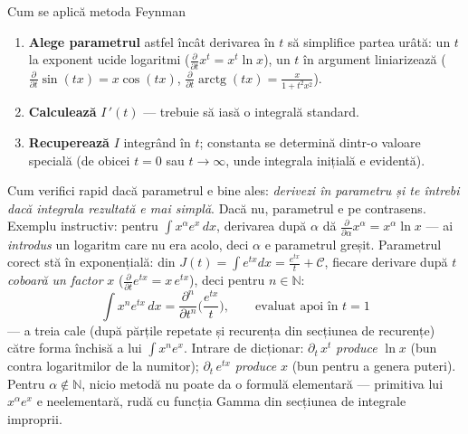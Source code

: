 \begin{tehbox}{Cum se aplică metoda Feynman}
\begin{enumerate}[leftmargin=*, itemsep=1pt]
\item \textbf{Alege parametrul} astfel încât derivarea în $t$ să simplifice partea urâtă: un $t$ la exponent ucide logaritmi ($\frac{\partial}{\partial t}x^t=x^t\ln x$), un $t$ în argument liniarizează ($\frac{\partial}{\partial t}\sin(tx)=x\cos(tx)$, $\frac{\partial}{\partial t}\operatorname{arctg}(tx)=\frac{x}{1+t^2x^2}$).
\item \textbf{Calculează} $I\,'(t)$ --- trebuie să iasă o integrală standard.
\item \textbf{Recuperează} $I$ integrând în $t$; constanta se determină dintr-o valoare specială (de obicei $t=0$ sau $t\to\infty$, unde integrala inițială e evidentă).
\end{enumerate}
\end{tehbox}

\begin{obs}
Cum verifici rapid dacă parametrul e bine ales: \emph{derivezi în parametru și te întrebi dacă integrala rezultată e mai simplă}. Dacă nu, parametrul e pe contrasens. Exemplu instructiv: pentru $\int x^{\alpha}e^{x}\,dx$, derivarea după $\alpha$ dă $\frac{\partial}{\partial\alpha}x^{\alpha}=x^{\alpha}\ln x$ --- ai \emph{introdus} un logaritm care nu era acolo, deci $\alpha$ e parametrul greșit. Parametrul corect stă în exponențială: din $J(t)=\int e^{tx}dx=\frac{e^{tx}}{t}+\mathcal C$, fiecare derivare după $t$ \emph{coboară un factor} $x$ ($\frac{\partial}{\partial t}e^{tx}=x\,e^{tx}$), deci pentru $n\in\mathbb{N}$:
\[
\int x^{n}e^{tx}\,dx=\frac{\partial^{n}}{\partial t^{n}}\Big(\frac{e^{tx}}{t}\Big),\qquad\text{evaluat apoi în }t=1
\]
--- a treia cale (după părțile repetate și recurența din secțiunea de recurențe) către forma închisă a lui $\int x^ne^x$. Intrare de dicționar: $\partial_t\,x^{t}$ \emph{produce} $\ln x$ (bun contra logaritmilor de la numitor); $\partial_t\,e^{tx}$ \emph{produce} $x$ (bun pentru a genera puteri). Pentru $\alpha\notin\mathbb{N}$, nicio metodă nu poate da o formulă elementară --- primitiva lui $x^{\alpha}e^x$ e neelementară, rudă cu funcția Gamma din secțiunea de integrale improprii.
\end{obs}




